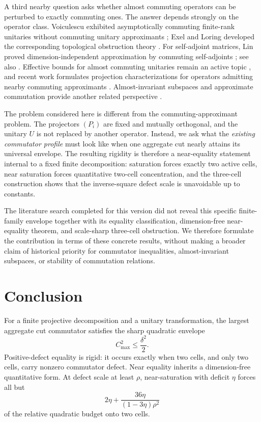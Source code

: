 \documentclass[11pt]{article}
\newcommand{\cmax}{C_{\max}}
\newcommand{\dd}{\delta}
\newcommand{\etaq}{\eta}
\begin{document}
A third nearby question asks whether almost commuting operators can be
perturbed to exactly commuting ones.  The answer depends strongly on the
operator class.  Voiculescu exhibited asymptotically commuting finite-rank
unitaries without commuting unitary approximants
\cite{Voiculescu1983}; Exel and Loring developed the corresponding
topological obstruction theory \cite{ExelLoring1989,ExelLoring1991}.  For
self-adjoint matrices, Lin proved dimension-independent approximation by
commuting self-adjoints \cite{Lin1997AlmostCommuting}; see also
\cite{FriisRordam1996,Hastings2009}.  Effective bounds for almost commuting
unitaries remain an active topic \cite{DorOnHallKachkovskiy2025}, and recent
work formulates projection characterizations for operators admitting nearby
commuting approximants \cite{Herrera2024,Herrera2026}.  Almost-invariant
subspaces and approximate commutation provide another related perspective
\cite{MarcouxPopovRadjavi2013}.

The problem considered here is different from the commuting-approximant
problem.  The projectors $(P_i)$ are fixed and mutually orthogonal, and the
unitary $U$ is not replaced by another operator.  Instead, we ask what the
\emph{existing commutator profile} must look like when one aggregate cut
nearly attains its universal envelope.  The resulting rigidity is therefore
a near-equality statement internal to a fixed finite decomposition:
saturation forces exactly two active cells, near saturation forces
quantitative two-cell concentration, and the three-cell construction shows
that the inverse-square defect scale is unavoidable up to constants.

The literature search completed for this version did not reveal this specific
finite-family envelope together with its equality classification,
dimension-free near-equality theorem, and scale-sharp three-cell obstruction.
We therefore formulate the contribution in terms of these concrete results,
without making a broader claim of historical priority for commutator
inequalities, almost-invariant subspaces, or stability of commutation
relations.

\section{Conclusion}

For a finite projective decomposition and a unitary transformation, the
largest aggregate cut commutator satisfies the sharp quadratic envelope
\[
  \cmax^2\le\frac{\dd^2}{2}.
\]
Positive-defect equality is rigid: it occurs exactly when two cells, and only
two cells, carry nonzero commutator defect.  Near equality inherits a
dimension-free quantitative form.  At defect scale at least $\rho$,
near-saturation with deficit $\etaq$ forces all but
\[
  2\etaq+
  \frac{36\etaq}{(1-3\etaq)\rho^2}
\]
of the relative quadratic budget onto two cells.
\end{document}
